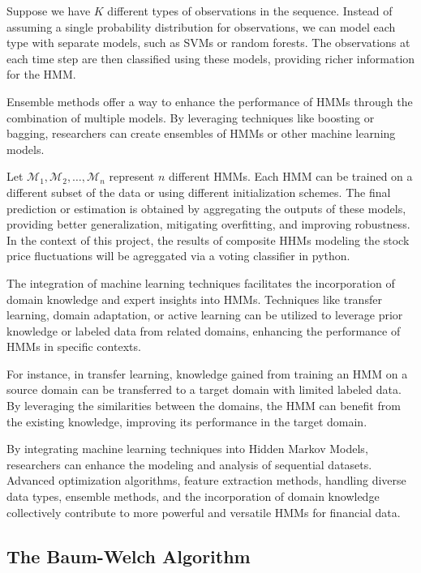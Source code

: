 \documentclass[a4paper,11pt]{article}
\begin{document}
Suppose we have $K$ different types of observations in the sequence. Instead of assuming a single probability distribution for observations, we can model each type with separate models, such as SVMs or random forests. The observations at each time step are then classified using these models, providing richer information for the HMM.

Ensemble methods offer a way to enhance the performance of HMMs through the combination of multiple models. By leveraging techniques like boosting or bagging, researchers can create ensembles of HMMs or other machine learning models. 

Let $\mathcal{M}_1, \mathcal{M}_2, \ldots, \mathcal{M}_n$ represent $n$ different HMMs. Each HMM can be trained on a different subset of the data or using different initialization schemes. The final prediction or estimation is obtained by aggregating the outputs of these models, providing better generalization, mitigating overfitting, and improving robustness. In the context of this project, the results of composite HHMs modeling the stock price fluctuations will be agreggated via a voting classifier in python.

The integration of machine learning techniques facilitates the incorporation of domain knowledge and expert insights into HMMs. Techniques like transfer learning, domain adaptation, or active learning can be utilized to leverage prior knowledge or labeled data from related domains, enhancing the performance of HMMs in specific contexts.

For instance, in transfer learning, knowledge gained from training an HMM on a source domain can be transferred to a target domain with limited labeled data. By leveraging the similarities between the domains, the HMM can benefit from the existing knowledge, improving its performance in the target domain.

By integrating machine learning techniques into Hidden Markov Models, researchers can enhance the modeling and analysis of sequential datasets. Advanced optimization algorithms, feature extraction methods, handling diverse data types, ensemble methods, and the incorporation of domain knowledge collectively contribute to more powerful and versatile HMMs for financial data.

\subsection{The Baum-Welch Algorithm}
\label{sec:baum-welch}
\end{document}
